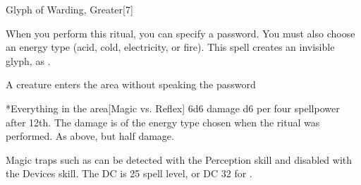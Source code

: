 \begin{spellsection}{Glyph of Warding, Greater}[7]
    \begin{spellheader}
    \end{spellheader}
    \begin{spellcontent}
        \begin{spelltargetinginfo}
        \end{spelltargetinginfo}
        \begin{spelleffects}

            \spellspecial When you perform this ritual, you can specify a password. You must also choose an energy type (acid, cold, electricity, or fire).
            \spellline
            \spelleffect This spell creates an invisible glyph, as .
            \begin{spelltrigger}{A creature enters the area without speaking the password}
                \begin{spelltargets}*{Everything in the area}[Magic vs. Reflex]
                    \spellsuccess 6d6 damage \add d6 per four spellpower after 12th. The damage is of the energy type chosen when the ritual was performed.
                    \spellfailure As above, but half damage.
                \end{spelltargets}
            \end{spelltrigger}
        \end{spelleffects}
    \end{spellcontent}
    \begin{spellfooter}
        \spellnotes Magic traps such as  can be detected with the Perception skill and disabled with the Devices skill. The DC is 25 \add spell level, or DC 32 for .
    \end{spellfooter}
\end{spellsection}

